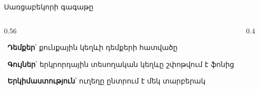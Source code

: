\begin{frame}{Սառցաբեկորի գագաթը}
  \begin{columns}[c]
    \begin{column}{0.56\textwidth}
      \begin{card}\ \textbf{Դեմքեր}՝ քունքային կեղևի դեմքերի հատվածը\end{card}
      \begin{card}\ \textbf{Գույներ}՝ երկրորդային տեսողական կեղևը շփոթվում է ֆոնից\end{card}
      \begin{card}\ \textbf{Երկիմաստություն}՝ ուղեղը ընտրում է մեկ տարբերակ\end{card}
    \end{column}
    \begin{column}{0.4\textwidth}
    \end{column}
  \end{columns}
\end{frame}
